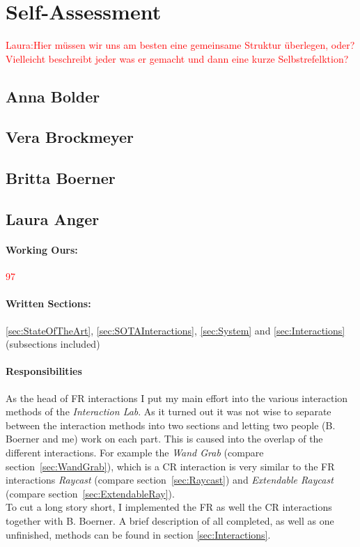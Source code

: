 \section{Self-Assessment} \label{sec:SA} %

\textcolor{red}{Laura:Hier müssen wir uns am besten eine gemeinsame Struktur überlegen, oder? Vielleicht beschreibt jeder was er gemacht und dann eine kurze Selbstrefelktion?}


\subsection{Anna Bolder} \label{sec:SAAnna}



\subsection{Vera Brockmeyer} \label{sec:SAVera}

\subsection{Britta Boerner} \label{sec:SABritta}

\newpage
\subsection{Laura Anger} \label{sec:SALaura}

\paragraph{Working Ours:} \textcolor{red}{97}
\paragraph{Written Sections:} \ref{sec:StateOfTheArt},  \ref{sec:SOTAInteractions}, \ref{sec:System} and \ref{sec:Interactions} (subsections included)
\paragraph{Responsibilities}
As the head of FR interactions I put my main effort into the various interaction methods of the \textit{Interaction Lab}. As it turned out it was not wise to separate between the interaction methods into two sections and letting two people (B. Boerner and me) work on each part. This is caused into the overlap of the different interactions. For example the \textit{Wand Grab} (compare section~\ref{sec:WandGrab}), which is a CR interaction is very similar to the FR interactions \textit{Raycast} (compare section~\ref{sec:Raycast}) and \textit{Extendable Raycast} (compare section~\ref{sec:ExtendableRay}). \\
To cut a long story short, I implemented the FR as well the CR interactions together with B. Boerner. A brief description of all completed, as well as one unfinished, methods can be found in section \ref{sec:Interactions}.\\


